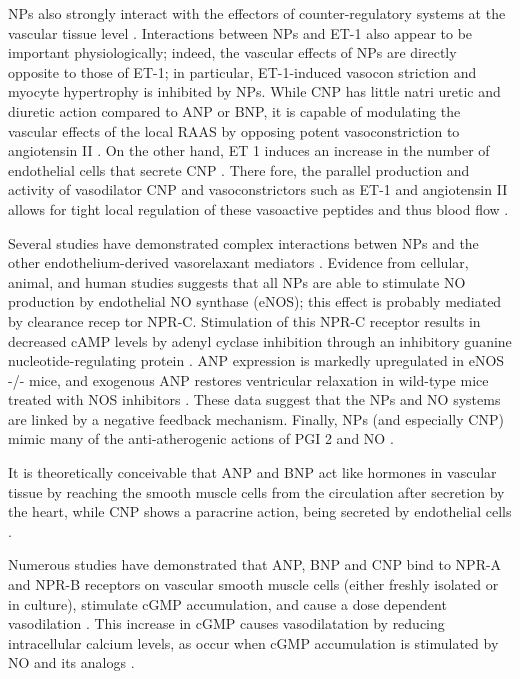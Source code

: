\documentclass[14pt,a4paper,onecolumn]{extarticle}
\begin{document}
NPs also strongly interact with the effectors of counter-regulatory systems at the vascular tissue level \citep{13} \citep{28} \citep{77} \citep{bib33} \citep{97} \citep{98} \citep{99}. Interactions between NPs and ET-1 also appear to be important physiologically; indeed, the vascular effects of NPs are directly opposite to those of ET-1; in particular, ET-1-induced vasocon striction and myocyte hypertrophy is inhibited by NPs. While CNP has little natri uretic and diuretic action compared to ANP or BNP, it is capable of modulating the vascular effects of the local RAAS by opposing potent vasoconstriction to angiotensin II \citep{269}. On the other hand, ET 1 induces an increase in the number of endothelial cells that secrete CNP \citep{279}. There fore, the parallel production and activity of vasodilator CNP and vasoconstrictors such as ET-1 and angiotensin II allows for tight local regulation of these vasoactive peptides and thus blood flow \citep{267} \citep{269} \citep{279}. %

Several studies have demonstrated complex interactions betwen NPs and the other endothelium-derived vasorelaxant mediators \citep{267}. Evidence from cellular, animal, and human studies suggests that all NPs are able to stimulate NO production by endothelial NO synthase (eNOS); this effect is probably mediated by clearance recep tor NPR-C. Stimulation of this NPR-C receptor results in decreased cAMP levels by adenyl cyclase inhibition through an inhibitory guanine nucleotide-regulating protein \citep{270}. ANP expression is markedly upregulated in eNOS -/- mice, and exogenous ANP restores ventricular relaxation in wild-type mice treated with NOS inhibitors \citep{118}. These data suggest that the NPs and NO systems are linked by a negative feedback mechanism. Finally, NPs (and especially CNP) mimic many of the anti-atherogenic actions of PGI 2 and NO \citep{267}. %

It is theoretically conceivable that ANP and BNP act like hormones in vascular tissue by reaching the smooth muscle cells from the circulation after secretion by the heart, while CNP shows a paracrine action, being secreted by endothelial cells \citep{57} \citep{87} \citep{88}. %

Numerous studies have demonstrated that ANP, BNP and CNP bind to NPR-A and NPR-B receptors on vascular smooth muscle cells (either freshly isolated or in culture), stimulate cGMP accumulation, and cause a dose dependent vasodilation  \citep{269} \citep{270} \citep{271}. This increase in cGMP causes vasodilatation by reducing intracellular calcium levels, as occur when cGMP accumulation is stimulated by NO and its analogs . %
\end{document}

